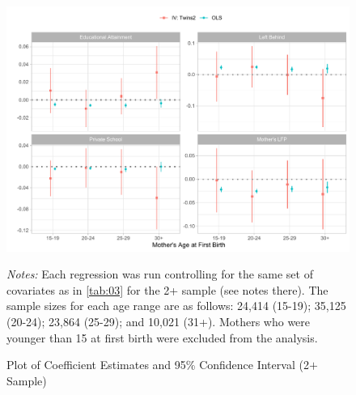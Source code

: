\documentclass[11pt,a4paper]{article}
\newcommand\fnote[1]{\captionsetup{font=footnotesize}\caption*{#1}}
\begin{document}
\begin{figure}[h!]
\centering
\caption{\label{fig:05}Plot of Coefficient Estimates and 95\% Confidence Interval (2$ + $ Sample)}
\includegraphics[width=\textwidth]{figures/age_mods.pdf}
\fnote{\textit{Notes:} Each regression was run controlling for the same set of covariates as in \autoref{tab:03} for the 2+ sample (see notes there). The sample sizes for each age range are as follows: 24,414 (15-19); 35,125 (20-24); 23,864 (25-29); and 10,021 (31+). Mothers who were younger than 15 at first birth were excluded from the analysis.}
\end{figure}
\end{document}
